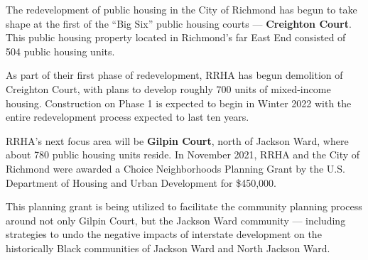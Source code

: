 \documentclass[
  letterpaper,
  DIV=11,
  numbers=noendperiod]{scrreprt}
\begin{document}
The redevelopment of public housing in the City of Richmond has begun to
take shape at the first of the ``Big Six'' public housing courts ---
\textbf{Creighton Court}. This public housing property located in
Richmond's far East End consisted of 504 public housing units.

As part of their first phase of redevelopment, RRHA has begun demolition
of Creighton Court, with plans to develop roughly 700 units of
mixed-income housing. Construction on Phase 1 is expected to begin in
Winter 2022 with the entire redevelopment process expected to last ten
years.

RRHA's next focus area will be \textbf{Gilpin Court}, north of Jackson
Ward, where about 780 public housing units reside. In November 2021,
RRHA and the City of Richmond were awarded a Choice Neighborhoods
Planning Grant by the U.S. Department of Housing and Urban Development
for \$450,000.

This planning grant is being utilized to facilitate the community
planning process around not only Gilpin Court, but the Jackson Ward
community --- including strategies to undo the negative impacts of
interstate development on the historically Black communities of Jackson
Ward and North Jackson Ward.
\end{document}
